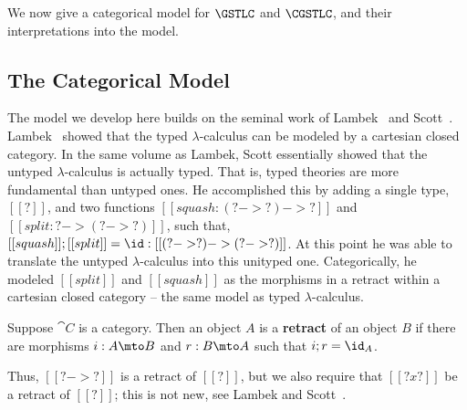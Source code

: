 We now give a categorical model for $\GSTLC$ and $\CGSTLC$, and their
interpretations into the model.  
\subsection{The Categorical Model}
\label{subsec:the_categorical_model}
The model we develop here builds on the seminal work of
Lambek~\cite{Lambek:1980} and Scott~\cite{Scott:1980}.
Lambek~\cite{Lambek:1980} showed that the typed $\lambda$-calculus can
be modeled by a cartesian closed category.  In the same volume as
Lambek, Scott essentially showed that the untyped $\lambda$-calculus
is actually typed.  That is, typed theories are more fundamental than
untyped ones.  He accomplished this by adding a single type, $[[?]]$,
and two functions $[[squash : (? -> ?) -> ?]]$ and $[[split : ? -> (?
    -> ?)]]$, such that, $[[squash]];[[split]] = \id : [[(? -> ?) ->
    (?  -> ?)]]$. At this point he was able to translate the untyped
$\lambda$-calculus into this unityped one.  Categorically, he modeled
$[[split]]$ and $[[squash]]$ as the morphisms in a retract within a
cartesian closed category -- the same model as typed
$\lambda$-calculus.
\begin{definition}
  \label{def:retract}
  Suppose $\cat{C}$ is a category.  Then an object $A$ is a
  \textbf{retract} of an object $B$ if there are morphisms $i : A \mto
  B$ and $r : B \mto A$ such that $i;r = \id_A$.%
\end{definition}
Thus, $[[? -> ?]]$ is a retract of $[[?]]$, but we also require that
$[[? x ?]]$ be a retract of $[[?]]$; this is not new, see Lambek and
Scott~\cite{Lambek:1988}.  


